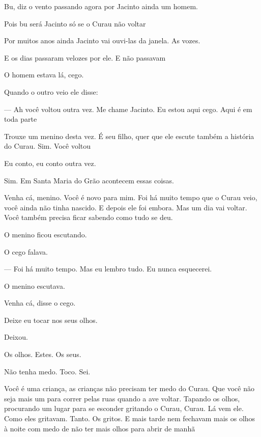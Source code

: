 \movetoevenpage

\vspace*{4cm}

Bu, diz o vento passando agora por Jacinto ainda um homem.

Pois bu será Jacinto só se o Curau não voltar

\breakk

\vspace*{4cm}

Por muitos anos ainda Jacinto vai ouvi-las da janela. As vozes.

E os dias passaram velozes por ele. E não passavam

\breakk
\clearpage
\thispagestyle{empty}

\movetooddpage

\vspace*{4cm}

O homem estava lá, cego.

Quando o outro veio ele disse:

--- Ah você voltou outra vez. Me chame Jacinto. Eu estou aqui cego. Aqui é
em toda parte

Trouxe um menino desta vez. É seu filho, quer que ele escute também a
história do Curau. Sim. Você voltou

Eu conto, eu conto outra vez.

Sim. Em Santa Maria do Grão acontecem essas coisas.

Venha cá, menino. Você é novo para mim. Foi há muito tempo que o Curau
veio, você ainda não tinha nascido. E depois ele foi embora. Mas um dia
vai voltar. Você também precisa ficar sabendo como tudo se deu.

O menino ficou escutando.

O cego falava.

--- Foi há muito tempo. Mas eu lembro tudo. Eu nunca esquecerei.

O menino escutava.

Venha cá, disse o cego.

Deixe eu tocar nos seus olhos.

Deixou.

Os olhos. Estes. Os seus.

Não tenha medo. Toco. Sei.

Você é uma criança, as crianças não precisam ter medo do Curau. Que você
não seja mais um para correr pelas ruas quando a ave voltar. Tapando os
olhos, procurando um lugar para se esconder gritando o Curau, Curau. Lá
vem ele. Como eles gritavam. Tanto. Os gritos. E mais tarde nem fechavam
mais os olhos à noite com medo de não ter mais olhos para abrir de manhã\\

